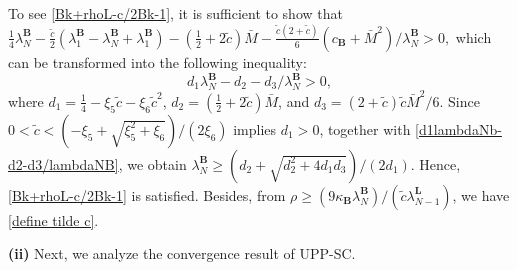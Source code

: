\documentclass[12pt,draftcls,onecolumn]{IEEEtran}
\begin{document}
To see \eqref{Bk+rhoL-c/2Bk-1}, it is sufficient to show that $\frac{1}{4}\lambda_N^{\mathbf{B}}-\frac{\tilde{c}}{2}(\lambda_1^{\mathbf{B}}-\lambda_N^{\mathbf{B}}+\lambda_1^{\mathbf{B}})-(\frac{1}{2}+2\tilde{c})\bar{M}
-\frac{\tilde{c}(2+\tilde{c})}{6}(c_\mathbf{B}+\bar{M}^2)/\lambda_N^{\mathbf{B}}> 0,$
which can be transformed into the following inequality:
\begin{equation}\label{d1lambdaNb-d2-d3/lambdaNB}
	d_1\lambda_N^{\mathbf{B}}-d_2-d_3/\lambda_N^{\mathbf{B}} >0,
\end{equation}
where $d_1= \frac{1}{4}- \xi_5 \tilde{c}-\xi_6 \tilde{c}^2$, $d_2 = (\frac{1}{2}+2\tilde{c})\bar{M}$, and $d_3={(2+\tilde{c})\tilde{c}}\bar{M}^2/6$.
Since $0<\tilde{c}<({-\xi_5+\sqrt{\xi_5^2+\xi_6}})/({2\xi_6})$ implies $d_1>0$, together with \eqref{d1lambdaNb-d2-d3/lambdaNB}, we obtain $\lambda_N^{\mathbf{B}}\geq ({d_2+\sqrt{d_2^2+4d_1d_3}})/({2d_1})$. Hence, \eqref{Bk+rhoL-c/2Bk-1} is satisfied. Besides, from $\rho \geq ({9\kappa_{\mathbf{B}}\lambda_N^{\mathbf{B}}})/({\tilde{c}\lambda_{N-1}^{\mathbf{L}}})$, we have \eqref{define tilde c}.

\textbf{(ii)}
Next, we analyze the convergence result of UPP-SC. 
\end{document}
